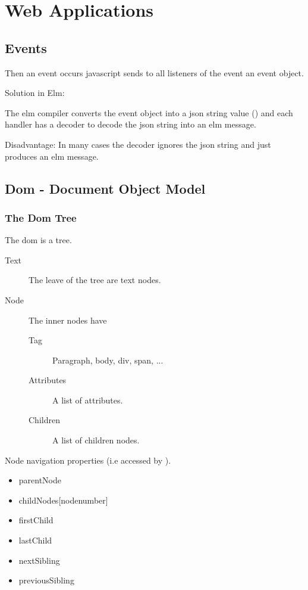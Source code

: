 \chapter{Web Applications}
\label{chapter:web}



\section{Events}

Then an event occurs javascript sends to all listeners of the event an event
object.

Solution in Elm:

The elm compiler converts the event object into a json string value
() and each handler has a decoder to decode the json
string into an elm message.

Disadvantage: In many cases the decoder ignores the json string and just
produces an elm message.

\section{Dom - Document Object Model}
\label{sec:dom}


\subsection{The Dom Tree}

The dom is a tree.
\begin{description}
\item[Text] The leave of the tree are text nodes.

\item[Node] The inner nodes have

  \begin{description}
  \item[Tag] Paragraph, body, div, span, ...
  \item[Attributes] A list of attributes.
  \item[Children] A list of children nodes.
  \end{description}

\end{description}

Node navigation properties (i.e accessed by ).
\begin{itemize}
\item
  parentNode
\item
  childNodes[nodenumber]
\item
  firstChild
\item
  lastChild
\item
  nextSibling
\item
  previousSibling
\end{itemize}

